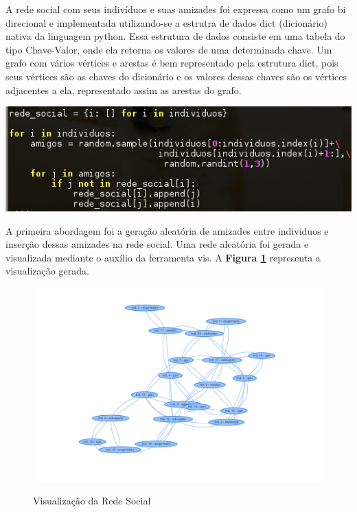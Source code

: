 A rede social com seus indivíduos e suas amizades foi expressa como um grafo bi direcional e implementada utilizando-se a estrutra de dados dict (dicionário) nativa da linguagem python. Essa estrutura de dados consiste em uma tabela do tipo Chave-Valor, onde ela retorna os valores de uma determinada chave. Um grafo com vários vértices e arestas é bem representado pela estrutura dict, pois seus vértices são as chaves do dicionário e os valores dessas chaves são os vértices adjacentes a ela, representado assim as arestas do grafo.

\begin{center}
  \includegraphics[scale=0.35]{./02-figuras/dict.png}
  \label{fig:patoA}
\end{center}


A primeira abordagem foi a geração aleatória de amizades entre individuos e inserção dessas amizades na rede social. Uma rede aleatória foi gerada e visualizada mediante o auxílio da ferramenta vis. 
A \textbf{Figura \ref{fig:patoB}} representa a visualização gerada.

\begin{figure}
	\centering
	\caption{Visualização da Rede Social} 
	\includegraphics[scale=0.4]{./02-figuras/vis.png}
	\label{fig:patoB}
\end{figure}

